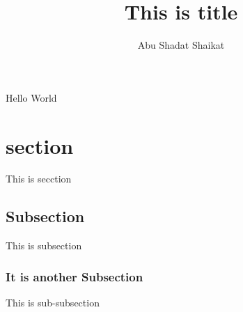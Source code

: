 \documentclass{article}
\begin{document}
\title{This is title}
\author{Abu Shadat Shaikat}
	Hello World
	\section{section}
	This is secction
	\subsection{Subsection}
	This is subsection
	\subsubsection{It is another Subsection}
	This is sub-subsection
\end{document}
